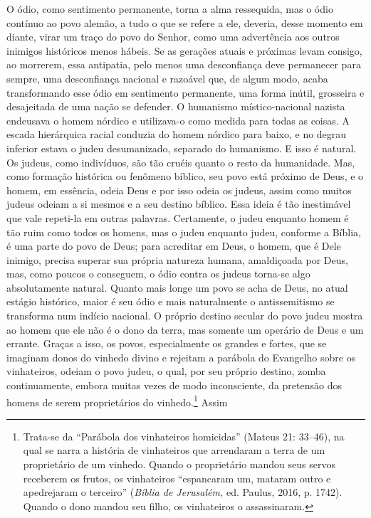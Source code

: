 O ódio, como sentimento permanente, torna a alma ressequida, mas o ódio
contínuo ao povo alemão, a tudo o que se refere a ele, deveria, desse
momento em diante, virar um traço do povo do Senhor, como uma
advertência aos outros inimigos históricos menos hábeis. Se as gerações
atuais e próximas levam consigo, ao morrerem, essa antipatia, pelo menos
uma desconfiança deve permanecer para sempre, uma desconfiança nacional
e razoável que, de algum modo, acaba transformando esse ódio em
sentimento permanente, uma forma inútil, grosseira e desajeitada de uma
nação se defender. O humanismo místico-nacional nazista endeusava o
homem nórdico e utilizava-o como medida para todas as coisas. A escada
hierárquica racial conduzia do homem nórdico para baixo, e no degrau
inferior estava o judeu desumanizado, separado do humanismo. E isso é
natural. Os judeus, como indivíduos, são tão cruéis quanto o resto da
humanidade. Mas, como formação histórica ou fenômeno bíblico, seu povo
está próximo de Deus, e o homem, em essência, odeia Deus e por isso
odeia os judeus, assim como muitos judeus odeiam a si mesmos e a seu
destino bíblico. Essa ideia é tão inestimável que vale repeti-la em
outras palavras. Certamente, o judeu enquanto homem é tão ruim como
todos os homens, mas o judeu enquanto judeu, conforme a Bíblia, é uma
parte do povo de Deus; para acreditar em Deus, o homem, que é Dele
inimigo, precisa superar sua própria natureza humana, amaldiçoada por
Deus, mas, como poucos o conseguem, o ódio contra os judeus torna-se
algo absolutamente natural. Quanto mais longe um povo se acha de Deus,
no atual estágio histórico, maior é seu ódio e mais naturalmente o
antissemitismo se transforma num indício nacional. O próprio destino
secular do povo judeu mostra ao homem que ele não é o dono da terra, mas
somente um operário de Deus e um errante. Graças a isso, os povos,
especialmente os grandes e fortes, que se imaginam donos do vinhedo
divino e rejeitam a parábola do Evangelho sobre os vinhateiros, odeiam o
povo judeu, o qual, por seu próprio destino, zomba continuamente, embora
muitas vezes de modo inconsciente, da pretensão dos homens de serem
proprietários do vinhedo.\footnote{Trata-se da ``Parábola dos
  vinhateiros homicidas'' (Mateus 21: 33\emph{--}46), na qual se narra a
  história de vinhateiros que arrendaram a terra de um proprietário de
  um vinhedo. Quando o proprietário mandou seus servos receberem os
  frutos, os vinhateiros ``espancaram um, mataram outro e apedrejaram o
  terceiro'' (\emph{Bíblia de Jerusalém,} ed. Paulus, 2016, p. 1742).
  Quando o dono mandou seu filho, os vinhateiros o assassinaram.} Assim
